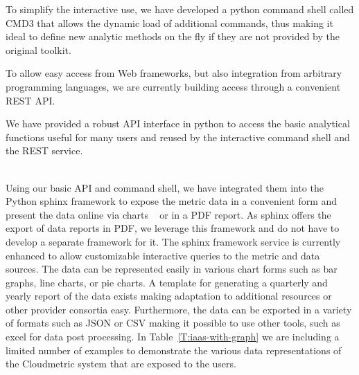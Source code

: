 \documentclass{tex/sig-alternate-2013}
\begin{document}
\begin{description}[leftmargin=*,itemsep=0pt,topsep=0pt]

\item[Interactive Command Shell.] To simplify the interactive use, we have developed a python command shell called CMD3 that allows the dynamic load of additional commands, thus making it ideal to define new analytic methods on the fly if they are not provided by the original toolkit.

\item[REST API.] To allow easy access from Web frameworks, but also integration from arbitrary programming languages, we are currently building access through a convenient REST API.

\item[Programming API.] We have provided a robust API interface in python to access the basic analytical functions useful for many users and reused by the interactive command shell and the REST service.

\item[Graphical Representation and Printable Reports.] ~\\ Using our basic API and command shell, we have integrated them into the Python sphinx framework \cite{brandl2009sphinx} to expose the metric data in a convenient form and present the data online via charts ~\cite{highsoft2012highcharts} or in a PDF report. As sphinx offers the export of data reports in PDF, we leverage this framework and do not have to develop a separate framework for it. The sphinx framework service is currently enhanced to allow customizable interactive queries to the metric and data sources. The data can be represented easily in various chart forms such as bar graphs, line charts, or pie charts. A template for generating a quarterly and yearly report of the data exists making adaptation to additional resources or other provider consortia easy. Furthermore, the data can be exported in a variety of formats such as JSON or CSV making it possible to use other tools, such as excel for data post processing.  In Table~\ref{T:iaas-with-graph} we are including a limited number of examples to demonstrate the various data representations of the Cloudmetric system that are exposed to the users.

\end{description}
\end{document}

